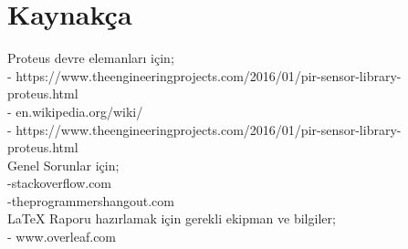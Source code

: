 \documentclass[conference]{IEEEtran}
\begin{document}
        \section{Kaynakça}
Proteus devre elemanları için;\\
- https://www.theengineeringprojects.com/2016/01/pir-sensor-library-proteus.html\\
- en.wikipedia.org/wiki/\\
- https://www.theengineeringprojects.com/2016/01/pir-sensor-library-proteus.html\\
Genel Sorunlar için;\\
-stackoverflow.com\\
-theprogrammershangout.com\\
 LaTeX Raporu hazırlamak için gerekli ekipman ve bilgiler;\\
- www.overleaf.com\\\\
\end{document}
